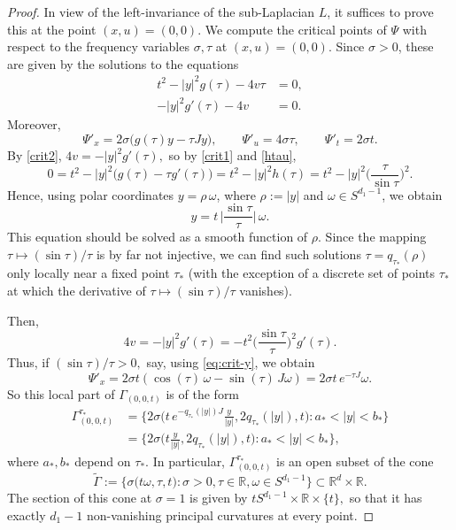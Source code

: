 \documentclass[leqno]{amsart}
\theoremstyle{definition}
\theoremstyle{remark}
\numberwithin{equation}{section}
\newcommand{\R}{\mathbb{R}}
\begin{document}
\begin{proof}
In view of the left-invariance of the sub-Laplacian $L$, it suffices to prove this at the point $(x,u)=(0,0)$. We compute the critical points of $\Psi$ with respect to the frequency variables $\sigma,\tau$ at $(x,u)=(0,0)$. Since $\sigma>0$, these are given by the solutions to the equations
\begin{align}\label{crit1}
t^2-|y|^2 g(\tau) -4v\tau & = 0,\\
   -|y|^2 g'(\tau) -4v & = 0. \label{crit2}
\end{align}
Moreover,
\[
\Psi'_x = 2\sigma\big(g(\tau)y-\tau Jy\big),\qquad
\Psi'_u = 4\sigma \tau,\qquad
\Psi'_t = 2\sigma t.
\]
By \eqref{crit2}, $4v=-|y|^2 g'(\tau),$ so by \eqref{crit1} and \eqref{htau},
\[
0=t^2-|y|^2 \big(g(\tau)-\tau g'(\tau)\big)=t^2-|y|^2 h(\tau) =t^2-|y|^2\Big(\frac {\tau}{\sin \tau}\Big)^2.
\]
Hence, using polar coordinates $y=\rho\,\omega$, where $\rho:=|y|$ and $\omega\in S^{d_1-1}$, we obtain
\begin{equation}\label{eq:crit-y}
y=t\,\Big|\frac{\sin\tau}{\tau}\Big|\,\omega.
\end{equation}
This equation should be solved as a smooth function of $\rho.$  Since the mapping $\tau \mapsto (\sin \tau)/\tau$ is by far not injective, we can  find  such solutions $\tau=q_{\tau_*}(\rho)$ only locally near a fixed point $\tau_*$ (with the exception of a discrete set of points $\tau_*$ at which the derivative of   $\tau \mapsto (\sin \tau)/\tau$ vanishes).

Then, \[ 4v=-|y|^2g'(\tau) =-t^2\Big(\frac{\sin\tau}{\tau}\Big)^2g'(\tau). \] 
Thus, if  $(\sin \tau)/\tau>0,$ say, using \eqref{eq:crit-y}, we obtain
\[
\Psi'_x=2\sigma t\left( \cos(\tau) \, \omega -  \sin(\tau) \, J\omega\right)
=2\sigma t \, e^{-\tau J}\omega.
\]
So this local part of $\Gamma_{(0,0,t)}$ is of the form 
\begin{align*}
\Gamma^{\tau_*}_{(0,0,t)}&= \Big\{2\sigma \Big(t\, e^{-q_{\tau_*}(|y|)J}\frac y{|y|},2q_{\tau_*}(|y|),t\Big): a_*<|y|<b_*\Big\}\\
&= \Big\{2\sigma \Big(t\frac y{|y|},2q_{\tau_*}(|y|),t\Big): a_*<|y|<b_*\Big\},
\end{align*}
where $a_*,b_*$ depend on $\tau_*.$
In particular, $\Gamma^{\tau_*}_{(0,0,t)}$ is an open subset of the cone
\begin{equation}\label{conetilde}
\tilde \Gamma:=\big\{\sigma \big(t \omega,\tau,t\big): \sigma>0, \tau\in\R, \omega\in S^{d_1-1}\big\}\subset \R^{d}\times \R.
\end{equation}
The   section  of this cone at $\sigma=1$ is given by $tS^{d_1-1}\times \R\times\{t\},$ so that it has exactly $d_1-1$ non-vanishing principal curvatures at every point.
\end{proof} 
\end{document}
